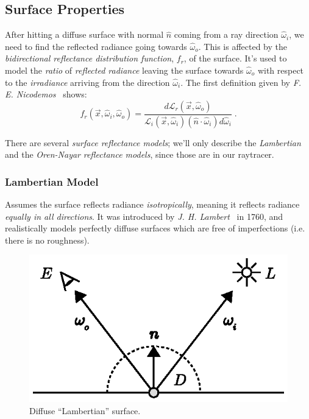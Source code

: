 \documentclass[a4paper, twocolumn]{article}
\begin{document}
        \subsection{Surface Properties} \label{sec:surface_properties}

            After hitting a diffuse surface with normal \(\hat{n}\) coming from a ray direction \(\hat{\omega}_i\), we need to find the reflected radiance going towards \(\hat{\omega}_o\). This is affected by the \emph{bidirectional reflectance distribution function}, \(f_r\), of the surface. It's used to model the \emph{ratio} of \emph{reflected radiance} leaving the surface towards \(\hat{\omega}_o\) with respect to the \emph{irradiance} arriving from the direction \(\hat{\omega}_i\). The first definition given by \emph{F. E. Nicodemos}~\cite{nicodemus1965directional} shows: \[f_r(\vec{x}, \hat{\omega}_i, \hat{\omega}_o) = \frac{d \mathcal{L}_{r}(\vec{x}, \hat{\omega}_o)}{\mathcal{L}_i(\vec{x}, \hat{\omega}_i)(\hat{n} \cdot \hat{\omega}_i)d\hat{\omega}_i}\; .\]

            There are several \emph{surface reflectance models}; we'll only describe the \emph{Lambertian} and the \emph{Oren-Nayar} \emph{reflectance models}, since those are in our raytracer.

            \subsubsection{Lambertian Model} \label{sec:lambertian_model}

                Assumes the surface reflects radiance \emph{isotropically}, meaning it reflects radiance \emph{equally in all directions}. It was introduced by \emph{J. H. Lambert}~\cite{lambert1760photometria} in 1760, and realistically models perfectly diffuse surfaces which are free of imperfections (i.e. there is no roughness).

                \begin{figure}[ht]
                    \centering
                    \includegraphics[width=0.8\linewidth]{share/lambertian_model.eps}
                    \caption{Diffuse ``Lambertian'' surface.}
                    \label{fig:lambertian_model}
                \end{figure}
\end{document}
